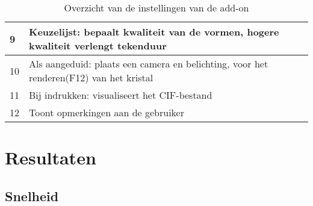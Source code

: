 \begin{table}[H]
\begin{tabular}{|l|l|}
9  & Keuzelijst: bepaalt kwaliteit van de vormen, hogere kwaliteit verlengt tekenduur                                                                                                                                                                                     \\ \hline
10 & Als aangeduid: plaats een camera en belichting, voor het renderen(F12) van het kristal                                                                                                                                                                               \\ \hline
11 & Bij indrukken: visualiseert het CIF-bestand                                                                                                                                                                                                                          \\ \hline
12 & Toont opmerkingen aan de gebruiker                                                                                                                                                                                                                                   \\ \hline
\end{tabular}
\caption{Overzicht van de instellingen van de add-on}
\end{table}
  
\section{Resultaten}

\subsection{Snelheid}

